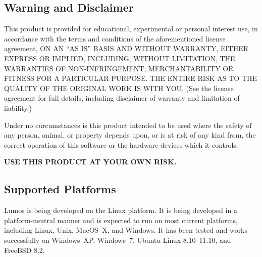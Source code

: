 \documentclass{article}
\begin{document}
\subsection{Warning and Disclaimer}
This product is provided for educational, experimental or personal
interest use, in accordance with the terms and conditions of the
aforementioned license agreement, ON AN ``AS IS'' BASIS AND WITHOUT
WARRANTY, EITHER EXPRESS OR IMPLIED, INCLUDING, WITHOUT LIMITATION,
THE WARRANTIES OF NON-INFRINGEMENT, MERCHANTABILITY OR FITNESS FOR A
PARTICULAR PURPOSE. THE ENTIRE RISK AS TO THE QUALITY OF THE ORIGINAL
WORK IS WITH YOU.  (See the license agreement for full details, 
including disclaimer of warranty and limitation of liability.)

Under no curcumstances is this product intended to be used where the
safety of any person, animal, or property depends upon, or is at
risk of any kind from, the correct operation of this software or
the hardware devices which it controls.

{\bf USE THIS PRODUCT AT YOUR OWN RISK.}

\subsection{Supported Platforms}
Lumos is being developed on the Linux platform.
It is being developed in a platform-neutral manner and is expected to run on
most current platforms, including Linux, Unix, MacOS~X, and Windows.  It has
been tested and works successfully on Windows~XP, Windows~7, Ubuntu Linux 8.10--11.10,
and FreeBSD 8.2.
\end{document}
